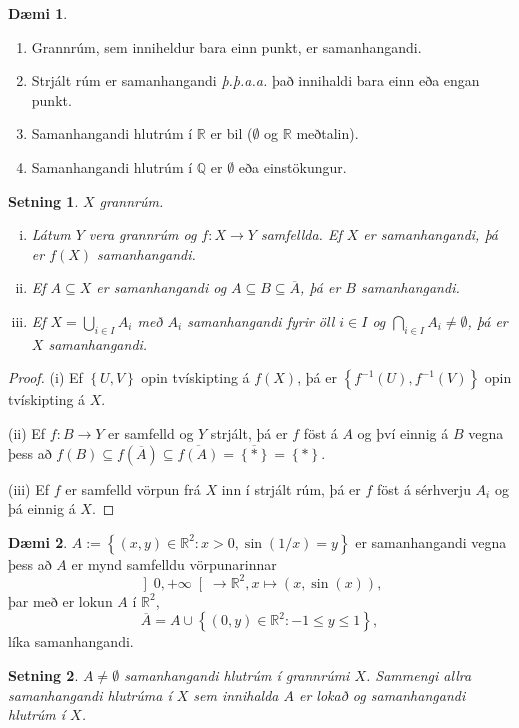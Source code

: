 \documentclass[a4paper,icelandic]{book}
\theoremstyle{definition}
\newtheorem{daemi}{Dæmi}[section]
\theoremstyle{plain}
\newtheorem{setn}{Setning}[section]
\theoremstyle{remark}
\newcommand{\R}{\mathbb{R}} %
\newcommand{\Q}{\mathbb{Q}} %
\begin{document}
\begin{daemi}
  \begin{enumerate}[(1)]
    \item Grannrúm, sem inniheldur bara einn punkt, er samanhangandi.
    \item Strjált rúm er samanhangandi \emph{þ.þ.a.a.} það innihaldi bara einn
      eða engan punkt.
    \item Samanhangandi hlutrúm í $\R$ er bil ($\emptyset$ og $\R$ meðtalin).
    \item Samanhangandi hlutrúm í $\Q$ er $\emptyset$ eða einstökungur.
  \end{enumerate}
\end{daemi}
\begin{setn}
  $X$ grannrúm.
  \begin{enumerate}[(i)]
    \item Látum $Y$ vera grannrúm og $f:X\to Y$ samfellda. Ef $X$ er
      samanhangandi, þá er $f(X)$ samanhangandi.
    \item Ef $A\subseteq X$ er samanhangandi og $A\subseteq B\subseteq \overline
      A$, þá er $B$ samanhangandi.
    \item Ef $X=\bigcup_{i\in I}A_i$ með $A_i$ samanhangandi fyrir öll $i\in I$
      og $\bigcap_{i\in I} A_i \neq \emptyset$, þá er $X$ samanhangandi.
  \end{enumerate}
\end{setn}
\begin{proof}
  (i) Ef $\left\{ U,V \right\}$ opin tvískipting á $f(X)$, þá er $\left\{
  f^{-1}(U), f^{-1}(V) \right\}$ opin tvískipting á $X$.

  (ii) Ef $f:B\to Y$ er samfelld og $Y$ strjált, þá er $f$ föst á $A$ og því
  einnig á $B$ vegna þess að $f(B)\subseteq f(\overline A) \subseteq
  \overline{f(A)} = \overline{\left\{ * \right\}} = \left\{ * \right\}$.

  (iii) Ef $f$ er samfelld vörpun frá $X$ inn í strjált rúm, þá er $f$ föst á
  sérhverju $A_i$ og þá einnig á $X$.
\end{proof}
\begin{daemi}
  $A := \left\{ (x,y)\in\R^2 : x>0, \sin(1/x)=y \right\}$ er
  samanhangandi vegna þess að $A$ er mynd samfelldu vörpunarinnar\[
  \left] 0,+\infty \right[\to\R^2, x\mapsto (x,\sin(x)),
  \]
  þar með er lokun $A$ í $\R^2$,\[
  \overline A = A\cup \left\{ (0,y)\in\R^2:-1\leq y\leq 1 \right\},
  \]
  líka samanhangandi.
\end{daemi}
\begin{setn}
  $A\neq \emptyset$ samanhangandi hlutrúm í grannrúmi $X$. Sammengi allra
  samanhangandi hlutrúma í $X$ sem innihalda $A$ er lokað og samanhangandi
  hlutrúm í $X$.
\end{setn}
\end{document}
